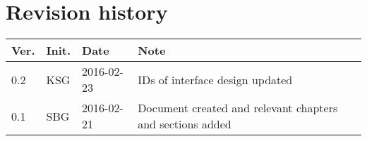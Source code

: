 \label{chp_revisionHistory}
\chapter*{Revision history}

\begin{tabular}{b{1cm} b{1cm} b{2cm} b{8cm}}
	\textbf{Ver.} & \textbf{Init.} & \textbf{Date} & \textbf{Note}\\
	\hline
	0.2 & KSG & 2016-02-23 & IDs of interface design updated \\
    0.1 & SBG & 2016-02-21 & Document created and relevant chapters and sections added \\
\end{tabular}

